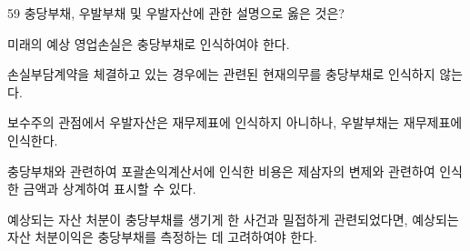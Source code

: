 \begin{question}{59}
충당부채, 우발부채 및 우발자산에 관한 설명으로 옳은 것은?
\begin{choices}
  \item 미래의 예상 영업손실은 충당부채로 인식하여야 한다.
  \item 손실부담계약을 체결하고 있는 경우에는 관련된 현재의무를 충당부채로 인식하지 않는다.
  \item 보수주의 관점에서 우발자산은 재무제표에 인식하지 아니하나, 우발부채는 재무제표에 인식한다.
  \item 충당부채와 관련하여 포괄손익계산서에 인식한 비용은 제삼자의 변제와 관련하여 인식한 금액과 상계하여 표시할 수 있다.
  \item 예상되는 자산 처분이 충당부채를 생기게 한 사건과 밀접하게 관련되었다면, 예상되는 자산 처분이익은 충당부채를 측정하는 데 고려하여야 한다.
\end{choices}
\end{question}
